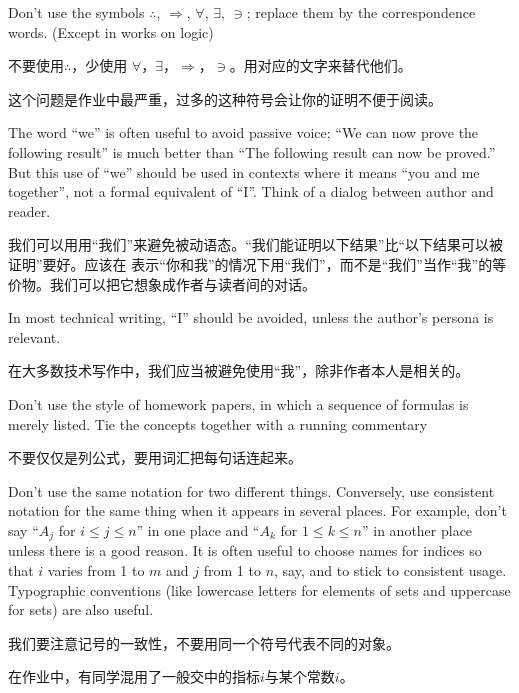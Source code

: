 \documentclass[presentation]{beamer}
\begin{document}
\begin{frame}[label={sec:org24c03f2}]{3}
Don't use the symbols \(\therefore\), \(\Rightarrow\), \(\forall\), \(\exists\), \(\ni\); replace them by the
correspondence words. (Except in works on logic)

\vspace{5mm} 不要使用\(\therefore\)，少使用 \(\forall\)，\(\exists\)，\(\Rightarrow\)，\(\ni\)。用对应的文字来替代他们。

\vspace{5mm} 这个问题是作业中最严重，过多的这种符号会让你的证明不便于阅读。
\end{frame}
\begin{frame}[label={sec:org8ee1453}]{6}
The word ``we'' is often useful to avoid passive voice; ``We can now prove the following result'' is
much better than ``The following result can now be proved.'' But this use of ``we'' should be used in
contexts where it means ``you and me together'', not a formal equivalent of ``I''. Think of a dialog
between author and reader.


\vspace{5mm}
我们可以用用“我们”来避免被动语态。“我们能证明以下结果”比“以下结果可以被证明”要好。应该在
表示“你和我”的情况下用``我们''，而不是“我们”当作“我”的等价物。我们可以把它想象成作者与读者间的对话。
\end{frame}


\begin{frame}[label={sec:orgaf8bda0}]{6}
\vspace{5mm}
In most technical writing, ``I'' should be avoided, unless the author’s persona is relevant.

\vspace{5mm}
在大多数技术写作中，我们应当被避免使用“我”，除非作者本人是相关的。
\end{frame}

\begin{frame}[label={sec:org70c4b3c}]{10}
Don't use the style of homework papers, in which a sequence of formulas is merely listed. Tie
the concepts together with a running commentary

\vspace{5mm}不要仅仅是列公式，要用词汇把每句话连起来。
\end{frame}
\begin{frame}[label={sec:org6f263c2}]{14}
Don't use the same notation for two different things. Conversely, use consistent notation for
the same thing when it appears in several places. For example, don't say ``\(A_j\)
for \(i\le j\le n\)'' in one place and ``\(A_k\) for \(1\le k\le n\)'' in another place unless there is a
good reason. It is often useful to choose names for indices so that \(i\) varies from 1 to \(m\)
and \(j\) from 1 to \(n\), say, and to stick to consistent usage. Typographic conventions (like
lowercase letters for elements of sets and uppercase for sets) are also useful.

\vspace{5mm}我们要注意记号的一致性，不要用同一个符号代表不同的对象。

\vspace{5mm}在作业中，有同学混用了一般交中的指标\(i\)与某个常数\(i\)。
\end{frame}
\end{document}
